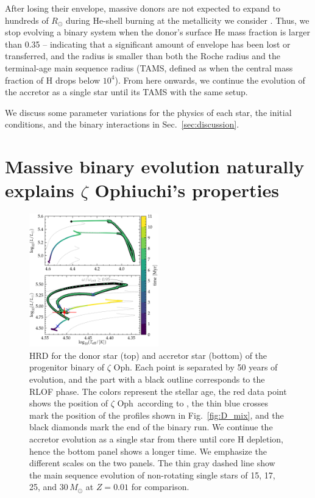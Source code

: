 \documentclass[twocolumn,twocolappendix,trackchanges]{aastex63}
\DeclareRobustCommand{\Figref}[1]{Fig.~\ref{#1}}
\DeclareRobustCommand{\Secref}[1]{Sec.~\ref{#1}}
\newcommand{\zoph}{$\zeta$ Oph}
\begin{document}
After losing their envelope, massive donors are not expected to expand
to hundreds of $R_\odot$ during He-shell burning at the metallicity we
consider \citep[e.g.,][]{laplace:20}. Thus, we stop evolving a binary
system when the donor's surface He mass fraction is larger than 0.35
-- indicating that a significant amount of envelope has been lost or
transferred, and the radius is smaller than both the Roche radius and
the terminal-age main sequence radius (TAMS, defined as when the
central mass fraction of H drops below $10^4$). From here onwards, %
we continue the evolution of the accretor as a single star until its TAMS
with the same setup.

We discuss some parameter variations for the physics of each star, the
initial conditions, and the binary interactions in \Secref{sec:discussion}.

\section{Massive binary evolution naturally explains $\zeta$
  Ophiuchi's properties}
\label{sec:best_model}

\begin{figure}[bp]
  \includegraphics[width=0.5\textwidth]{HRD_both}
  \caption{HRD for the donor star (top) and accretor star (bottom) of
    the progenitor binary of \zoph. Each point is separated by 50
    years of evolution, and the part with a black outline corresponds
    to the RLOF phase. The colors represent the stellar age, the red
    data point shows the position of \zoph\ according to
    , the thin blue crosses mark the
    position of the profiles shown in \Figref{fig:D_mix}, and the
    black diamonds mark the end of the binary run. We
    continue the accretor evolution as a single star from there until
    core H depletion, hence the bottom panel shows a longer time. We
    emphasize the different scales on the two panels. The thin gray
    dashed line show the main sequence evolution of non-rotating
    single stars of 15, 17, 25, and 30\,$M_\odot$ at $Z=0.01$ for
    comparison.}
  \label{fig:HRD_both}
\end{figure}
\end{document}
